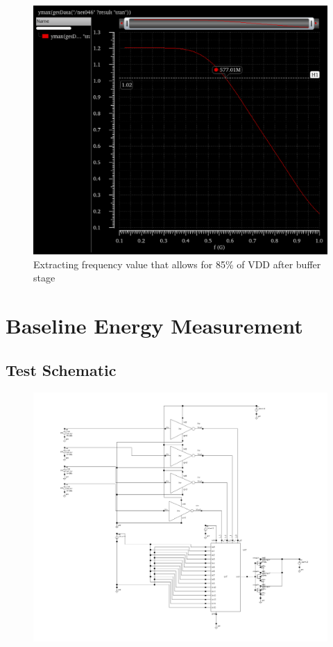 \documentclass[12pt]{article}
\begin{document}
\begin{figure}[H]
    \centering
    \includegraphics[width=0.75\linewidth]{writeup//figures/max_frequencies.png}
    \caption{Extracting frequency value that allows for 85\% of VDD after buffer stage}
\end{figure}

\newpage

\section{Baseline Energy Measurement}
\subsection{Test Schematic}

\begin{figure}[H]
    \centering
    \includegraphics[width=0.75\linewidth]{writeup//figures/lut_energy_testbench.png}
    \caption{}
\end{figure}
\end{document}
